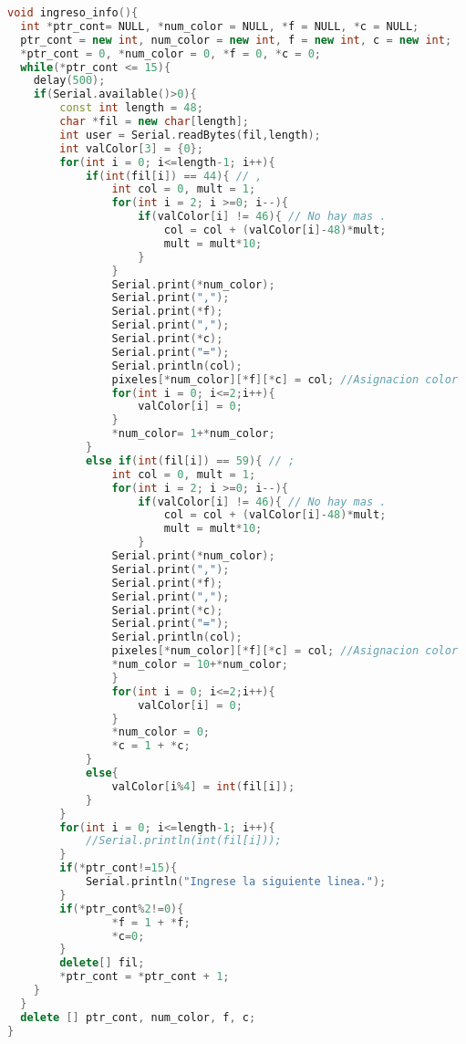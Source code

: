 \documentclass{article}
\begin{document}
\begin{lstlisting}[language=C++, label=error_guardarints]
void ingreso_info(){
  int *ptr_cont= NULL, *num_color = NULL, *f = NULL, *c = NULL;
  ptr_cont = new int, num_color = new int, f = new int, c = new int;
  *ptr_cont = 0, *num_color = 0, *f = 0, *c = 0;
  while(*ptr_cont <= 15){
  	delay(500);
    if(Serial.available()>0){
    	const int length = 48;
    	char *fil = new char[length];
      	int user = Serial.readBytes(fil,length);
      	int valColor[3] = {0};
      	for(int i = 0; i<=length-1; i++){
        	if(int(fil[i]) == 44){ // ,
          		int col = 0, mult = 1;
          		for(int i = 2; i >=0; i--){
            		if(valColor[i] != 46){ // No hay mas .
              			col = col + (valColor[i]-48)*mult;
              			mult = mult*10;
            		}
                }
              	Serial.print(*num_color);
                Serial.print(",");
                Serial.print(*f);
                Serial.print(",");
                Serial.print(*c);
                Serial.print("=");
                Serial.println(col);
              	pixeles[*num_color][*f][*c] = col; //Asignacion color
                for(int i = 0; i<=2;i++){
                	valColor[i] = 0;
              	}
              	*num_color= 1+*num_color;
    	    }
        	else if(int(fil[i]) == 59){ // ;
              	int col = 0, mult = 1;
          		for(int i = 2; i >=0; i--){
            		if(valColor[i] != 46){ // No hay mas .
              			col = col + (valColor[i]-48)*mult;
              			mult = mult*10;
            		}
                Serial.print(*num_color);
                Serial.print(",");
                Serial.print(*f);
                Serial.print(",");
                Serial.print(*c);
                Serial.print("=");
                Serial.println(col);
            	pixeles[*num_color][*f][*c] = col; //Asignacion color
                *num_color = 10+*num_color;
                }
              	for(int i = 0; i<=2;i++){
                	valColor[i] = 0;
              	}
          		*num_color = 0;
          		*c = 1 + *c;
        	}
            else{
            	valColor[i%4] = int(fil[i]);
            }
      	}
      	for(int i = 0; i<=length-1; i++){
        	//Serial.println(int(fil[i]));
        }
      	if(*ptr_cont!=15){
        	Serial.println("Ingrese la siguiente linea.");
      	}
      	if(*ptr_cont%2!=0){
          		*f = 1 + *f;
          		*c=0;
       	}
      	delete[] fil;
	    *ptr_cont = *ptr_cont + 1;
    }
  }
  delete [] ptr_cont, num_color, f, c;
}
\end{lstlisting}


\end{document}
